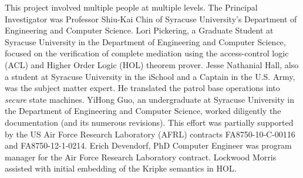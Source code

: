 This project involved multiple people at multiple levels. The Principal Investigator was Professor
Shiu-Kai Chin of Syracuse University's Department of Engineering and Computer Science. Lori Pickering,
a Graduate Student at Syracuse University in the Department of Engineering and Computer Science,
focused on the verification of complete mediation using the access-control logic (ACL) and Higher
Order Logic (HOL) theorem prover.  Jesse Nathanial Hall, also a student at Syracuse University in
the iSchool and a Captain in the U.S. Army, was the subject matter expert. He translated the patrol
base operations into {\em secure\/} state machines.  YiHong Guo, an undergraduate at Syracuse University
in the Department of Engineering and Computer Science, worked diligently the documentation (and its numerous revisions).
This effort was partially supported by the US Air Force Research Laboratory (AFRL) contracts FA8750-10-C-00116 and FA8750-12-1-0214.  Erich Devendorf, PhD Computer Engineer was program manager for the Air Force Research Laboratory contract.  Lockwood Morris assisted with initial embedding of the Kripke semantics in HOL.
